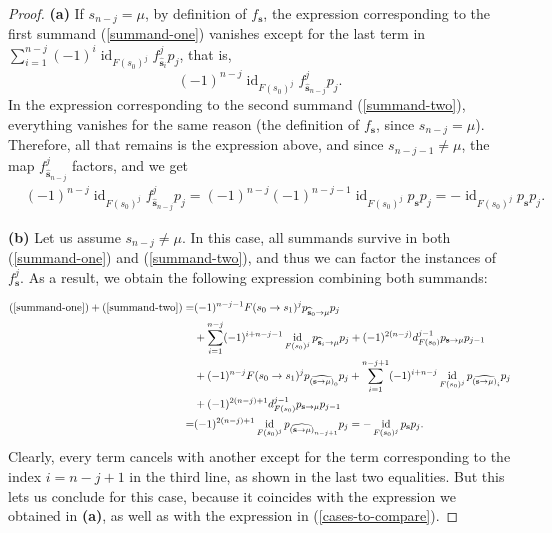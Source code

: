 \documentclass[reqno,11pt]{amsart}
\theoremstyle{plain}
\theoremstyle{remark}
\theoremstyle{definition}
\numberwithin{equation}{thm}
\DeclareMathOperator{\id}{id}
\begin{document}
\begin{proof}
		\textbf{(a)} If $s_{n-j} = \mu$, by definition of $f_{\textbf{s}}$, the expression corresponding to the first summand (\ref{summand-one}) vanishes except for the last term in $\sum_{i=1}^{n-j} (-1)^i \id_{F(s_0)^j} f_{\widehat{\textbf{s}}_i}^j p_j$, that is,
		\[
			(-1)^{n-j} \id_{F(s_0)^j} f_{\widehat{\textbf{s}}_{n-j}}^j p_j.
		\]
		In the expression corresponding to the second summand (\ref{summand-two}), everything vanishes for the same reason (the definition of $f_{\textbf{s}}$, since $s_{n-j} = \mu$). Therefore, all that remains is the expression above, and since $s_{n-j-1} \neq \mu$, the map $f_{\widehat{\textbf{s}}_{n-j}}^j$ factors, and we get
		\begin{equation*}
			\begin{aligned}
				&(-1)^{n-j} \id_{F(s_0)^j} f_{\widehat{\textbf{s}}_{n-j}}^j p_j = (-1)^{n-j} (-1)^{n-j-1} \id_{F(s_0)^j} p_{\textbf{s}} p_j = -\id_{F(s_0)^j} p_{\textbf{s}} p_j.
			\end{aligned}		
		\end{equation*}
		
		\textbf{(b)} Let us assume $s_{n-j} \neq \mu$. In this case, all summands survive in both (\ref{summand-one}) and (\ref{summand-two}), and thus we can factor the instances of $f_{\textbf{s}}^j$. As a result, we obtain the following expression combining both summands: 
		
		\begin{equation*}
			\begin{aligned}
				(\ref{summand-one}) + (\ref{summand-two}) =& (-1)^{n-j-1} F(s_0 \to s_1)^j p_{\widehat{\textbf{s}}_{0} \to \mu} p_j \\
				&+ \sum_{i=1}^{n-j} (-1)^{i+n-j-1} \id_{F(s_0)^j} p_{\widehat{\textbf{s}}_{i} \to \mu} p_j  +  (-1)^{2(n-j)} d_{F(s_0)}^{j-1}  p_{\textbf{s} \to \mu} p_{j-1}\\
				&+ (-1)^{n-j} F(s_0 \to s_1)^j p_{\widehat{(\textbf{s} \to \mu)}_{0} } p_j + \sum_{i=1}^{n-j+1} (-1)^{i+n-j}  \id_{F(s_0)^j} p_{\widehat{(\textbf{s} \to \mu)}_{i}} p_j \\
				&+ (-1)^{2(n-j)+1} d_{F(s_0)}^{j-1} p_{\textbf{s} \to \mu} p_{j-1}  \\
				=& (-1)^{2(n-j)+1} \id_{F(s_0)^j} p_{\widehat{(\textbf{s} \to \mu)}_{n-j+1}} p_j = - \id_{F(s_0)^j} p_{\textbf{s}} p_j.
			\end{aligned}
		\end{equation*}
		Clearly, every term cancels with another except for the term corresponding to the index $i = n-j+1$ in the third line, as shown in the last two equalities. But this lets us conclude for this case, because it coincides with the expression we obtained in \textbf{(a)}, as well as with the expression in (\ref{cases-to-compare}).
		

\end{proof}
\end{document}
